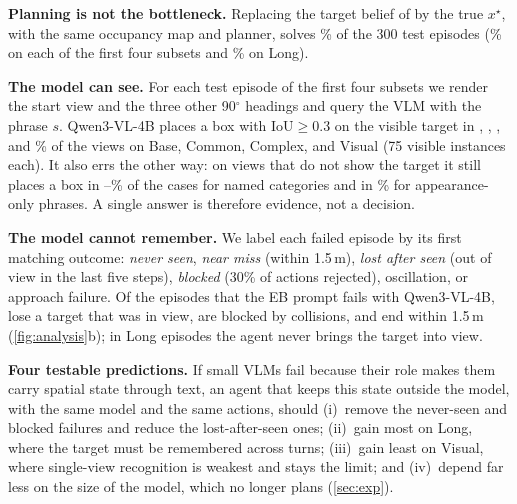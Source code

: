 \noindent\textbf{Planning is not the bottleneck.}
Replacing the target belief of \ours by the true $x^\star$, with the same occupancy map and planner, solves
\nOracle\% of the 300 test episodes (\nOracleBase\% on each of the first four subsets and \nOracleLong\% on Long).

\noindent\textbf{The model can see.}
For each test episode of the first four subsets we render the start view and the three other 90$^\circ$ headings
and query the VLM with the phrase $s$. Qwen3-VL-4B places a box with IoU${\ge}0.3$ on the visible target in
\nProbeThreeBase, \nProbeThreeCommon, \nProbeThreeComplex, and \nProbeThreeVisual\% of the views on Base, Common,
Complex, and Visual (75 visible instances each). It also errs the other way: on views that do not show the target it
still places a box in \nFalseBoxNamedLo--\nFalseBoxNamedHi\% of the cases for named categories and in
\nFalseBoxVisual\% for appearance-only phrases. A single answer is therefore evidence, not a decision.

\noindent\textbf{The model cannot remember.}
We label each failed episode by its first matching outcome: \emph{never seen}, \emph{near miss} (within 1.5\,m),
\emph{lost after seen} (out of view in the last five steps), \emph{blocked} (30\% of actions rejected), oscillation, or
approach failure.
Of the \nFailEBThree{} episodes that the EB prompt fails with Qwen3-VL-4B, \nLostEBThree{} lose a target that was in
view, \nBlockedEBThree{} are blocked by collisions, and \nNearEBThree{} end within 1.5\,m (\cref{fig:analysis}b);
in \nNeverLongEBThree{} Long episodes the agent never brings the target into view.

\noindent\textbf{Four testable predictions.}
If small VLMs fail because their role makes them carry spatial state through text, an agent that keeps this
state outside the model, with the same model and the same actions, should (i)~remove the never-seen and blocked failures
and reduce the lost-after-seen ones; (ii)~gain most on Long, where the target must be remembered across turns;
(iii)~gain least on Visual, where single-view recognition is weakest and stays the limit; and (iv)~depend far less
on the size of the model, which no longer plans (\cref{sec:exp}).
